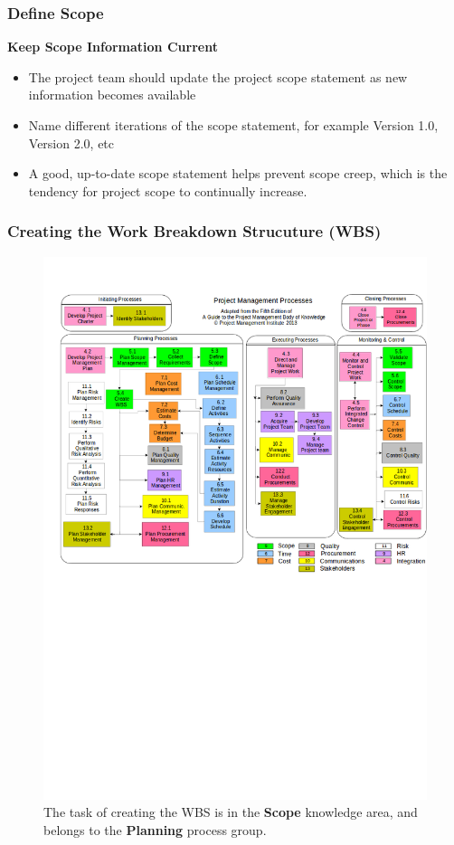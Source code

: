 \documentclass{beamer}
\begin{document}
\begin{frame}
\frametitle{Define Scope}
\textbf{Keep Scope Information Current}
\vspace{0.5cm}
\begin{itemize}
\item The project team should update the project scope statement as new information becomes available
\item Name different iterations of the scope statement, for example Version 1.0, Version 2.0, etc
\item A good, up-to-date scope statement helps prevent scope creep, which is the tendency for project scope to continually increase.
\end{itemize}
\end{frame}


\begin{frame}
\frametitle{Creating the Work Breakdown Strucuture (WBS)}
\begin{figure}
\caption{The task of creating the WBS is in the \textbf{Scope} knowledge area, and belongs to the \textbf{Planning} process group.}
\vspace{-0.8cm}
\includegraphics[scale=0.3]{mapping}
\end{figure}
\end{frame}
\end{document}
